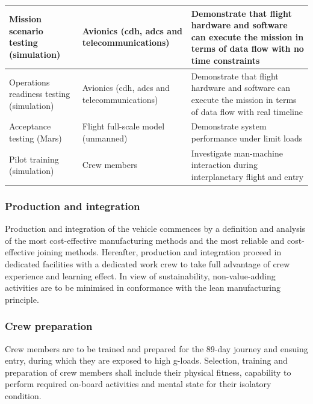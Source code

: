 \begin{table}[ht]
\begin{tabular}{|p{}|p{}|p{}|}
Mission scenario testing (simulation)        & Avionics (\gls{cdh}, \gls{adcs} and telecommunications)                                                                         & Demonstrate that flight hardware and software can execute the mission in terms of data flow with no time constraints                                                                                                              \\ \hline
Operations readiness testing (simulation)    & Avionics (\gls{cdh}, \gls{adcs} and telecommunications)                                                                           & Demonstrate that flight hardware and software can execute the mission in terms of data flow with real timeline                                                                                                            \\ \hline
Acceptance testing (Mars)                    & Flight full-scale model (unmanned)                                                                                      & Demonstrate system performance under limit loads                                                                                                                                                                                  \\ \hline
Pilot training (simulation) & Crew members & Investigate man-machine interaction during interplanetary flight and entry \\ \hline
\end{tabular}
\end{table}

\subsubsection{Production and integration}
Production and integration of the vehicle commences by a definition and analysis of the most cost-effective manufacturing methods and the most reliable and cost-effective joining methods. Hereafter, production and integration proceed in dedicated facilities with a dedicated work crew to take full advantage of crew experience and learning effect. In view of sustainability, non-value-adding activities are to be minimised in conformance with the lean manufacturing principle. 

\subsubsection{Crew preparation}
Crew members are to be trained and prepared for the 89-day journey and ensuing entry, during which they are exposed to high g-loads. Selection, training and preparation of crew members shall include their physical fitness, capability to perform required on-board activities and mental state for their isolatory condition.


